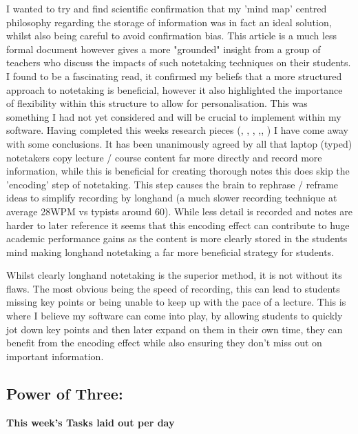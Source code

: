 I wanted to try and find scientific confirmation that my 'mind map' centred philosophy regarding the storage of information was in fact an ideal solution, whilst also being careful to avoid confirmation bias. This article is a much less formal document however gives a more "grounded" insight from a group of teachers who discuss the impacts of such notetaking techniques on their students. I found  to be a fascinating read, it confirmed my beliefs that a more structured approach to notetaking is beneficial, however it also highlighted the importance of flexibility within this structure to allow for personalisation. This was something I had not yet considered and will be crucial to implement within my software.
Having completed this weeks research pieces (, , , ,, ) I have come away with some conclusions. It has been unanimously agreed by all that laptop (typed) notetakers copy lecture / course content far more directly and record more information, while this is beneficial for creating thorough notes this does skip the 'encoding' step of notetaking. This step causes the brain to rephrase / reframe ideas to simplify recording by longhand (a much slower recording technique at average 28WPM vs typists around 60). While less detail is recorded and notes are harder to later reference it seems that this encoding effect can contribute to huge academic performance gains as the content is more clearly stored in the students mind making longhand notetaking a far more beneficial strategy for students. 

Whilst clearly longhand notetaking is the superior method, it is not without its flaws. The most obvious being the speed of recording, this can lead to students missing key points or being unable to keep up with the pace of a lecture. This is where I believe my software can come into play, by allowing students to quickly jot down key points and then later expand on them in their own time, they can benefit from the encoding effect while also ensuring they don't miss out on important information.


\subsection*{Power of Three:}
\textbf{This week's Tasks laid out per day}


